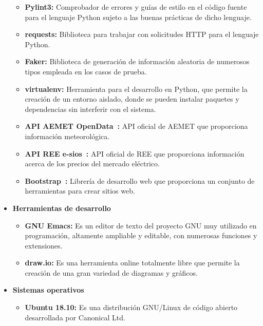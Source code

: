 \begin{itemize}
\begin{itemize}
  \item \textbf{Pylint3:} Comprobador de errores y guías de estilo en el código fuente para el lenguaje Python sujeto a las buenas prácticas de dicho lenguaje.
  \item \textbf{requests:} Biblioteca para trabajar con solicitudes HTTP para el lenguaje Python.
  \item \textbf{Faker:} Biblioteca de generación de información aleatoria de numerosos tipos empleada en los casos de prueba.
  \item \textbf{virtualenv: } Herramienta para el desarrollo en Python, que permite la creación de un entorno aislado, donde se pueden instalar paquetes y dependencias sin interferir con el sistema.
  \item \textbf{API AEMET OpenData~\cite{Aemet}:} \gls{API} oficial de \gls{AEMET} que proporciona información meteorológica.
  \item \textbf{API REE e-sios~\cite{Ree}:} \gls{API} oficial de \gls{REE} que proporciona información acerca de los precios del mercado eléctrico.
  \item \textbf{Bootstrap~\cite{Boots}:} Librería de desarrollo web que proporciona un conjunto de herramientas para crear sitios web.
  \end{itemize}
\item \textbf{Herramientas de desarrollo}
  \begin{itemize}
  \item \textbf{GNU Emacs:} Es un editor de texto del proyecto GNU muy utilizado en programación, altamente ampliable y editable, con numerosas funciones y extensiones.
  \item \textbf{draw.io:} Es una herramienta online totalmente libre que permite la creación de una gran variedad de diagramas y gráficos.
  \end{itemize}
\item \textbf{Sistemas operativos}
  \begin{itemize}
  \item \textbf{Ubuntu 18.10:} Es una distribución GNU/Linux de código abierto desarrollada por Canonical Ltd.
  \end{itemize}
\end{itemize}
